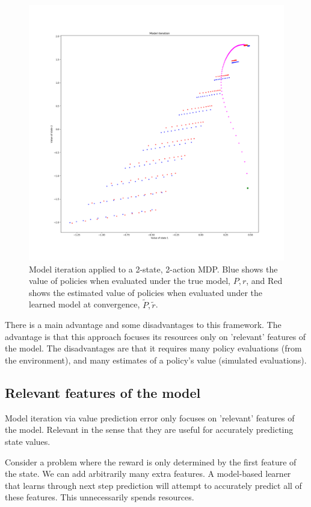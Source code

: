 \begin{figure}
\centering
\includegraphics[width=1.0\textwidth,height=1.0\textheight]{../../pictures/figures/model_iteration.png}
\caption{Model iteration applied to a 2-state, 2-action MDP.
Blue shows the value of policies when evaluated under the true model, $P, r$,
and Red shows the estimated value of policies when evaluated under the learned model at convergence, $\tilde P, \tilde r$.}
\end{figure}

There is a main advantage and some disadvantages to this framework.
The advantage is that this approach focuses its resources only on 'relevant' features of the model.
The disadvantages are that it requires many policy evaluations (from the environment),
and many estimates of a policy's value (simulated evaluations).

\subsection{Relevant features of the model}

Model iteration via value prediction error only focuses on 'relevant' features of the model.
Relevant in the sense that they are useful for accurately predicting state values.

Consider a problem where the reward is only determined by the first feature of the state.
We can add arbitrarily many extra features. A model-based learner that learns through next step prediction will attempt to
accurately predict all of these features. This unnecessarily spends resources.

